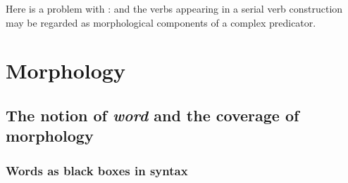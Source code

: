 \documentclass[UTF8, a4paper, oneside, scheme=plain]{ctexart}
\newcommand*{\term}[1]{\emph{#1}}
\begin{document}
Here is a problem with :
and the verbs appearing in a serial verb construction 
may be regarded as morphological components of a complex predicator.

\section{Morphology}

\subsection{The notion of \term{word} and the coverage of morphology}\label{sec:what-is-word}

\subsubsection{Words as black boxes in syntax}\label{sec:word-black-box}
\end{document}
